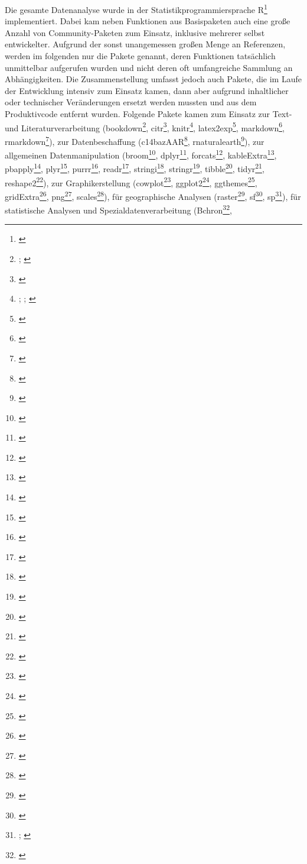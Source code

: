 \documentclass[openany,twoside,twocolumn]{book}
\let\rmarkdownfootnote\footnote%
\def\footnote{\protect\rmarkdownfootnote}
\begin{document}
Die gesamte Datenanalyse wurde in der Statistikprogrammiersprache
R\footnote{\textcite{RCoreTeamLanguageEnvironmentStatistical2016}}
implementiert. Dabei kam neben Funktionen aus Basispaketen auch eine
große Anzahl von Community-Paketen zum Einsatz, inklusive mehrerer
selbst entwickelter. Aufgrund der sonst unangemessen großen Menge an
Referenzen, werden im folgenden nur die Pakete genannt, deren Funktionen
tatsächlich unmittelbar aufgerufen wurden und nicht deren oft
umfangreiche Sammlung an Abhängigkeiten. Die Zusammenstellung umfasst
jedoch auch Pakete, die im Laufe der Entwicklung intensiv zum Einsatz
kamen, dann aber aufgrund inhaltlicher oder technischer Veränderungen
ersetzt werden mussten und aus dem Produktivcode entfernt wurden.
Folgende Pakete kamen zum Einsatz zur Text- und Literaturverarbeitung
(bookdown\footnote{\textcite{xie_bookdown_2016};
  \textcite{xie_bookdown_2018}}, citr\footnote{\textcite{aust_citr_2017}},
knitr\footnote{\textcite{xie_dynamic_2015}; \textcite{xie_knitr_2014};
  \textcite{xie_knitr_2018}}, latex2exp\footnote{\textcite{meschiari_latex2exp_2015}},
markdown\footnote{\textcite{allaire_markdown_2017}}, rmarkdown\footnote{\textcite{allaire_rmarkdown_2018}}),
zur Datenbeschaffung (c14bazAAR\footnote{\textcite{schmid_c14bazaar_2018}},
rnaturalearth\footnote{\textcite{south_rnaturalearth_2017}}), zur
allgemeinen Datenmanipulation (broom\footnote{\textcite{robinson_broom_2018}},
dplyr\footnote{\textcite{wickham_dplyr_2018}}, forcats\footnote{\textcite{wickham_forcats_2018}},
kableExtra\footnote{\textcite{zhu_kableextra_2018}}, pbapply\footnote{\textcite{solymos_pbapply_2018}},
plyr\footnote{\textcite{wickham_split-apply-combine_2011}},
purrr\footnote{\textcite{henry_purrr_2018}}, readr\footnote{\textcite{wickham_readr_2017}},
stringi\footnote{\textcite{gagolewski_r_2018}}, stringr\footnote{\textcite{wickham_stringr_2018}},
tibble\footnote{\textcite{muller_tibble_2018}}, tidyr\footnote{\textcite{wickham_tidyr_2018}},
reshape2\footnote{\textcite{wickham_reshaping_2007}}), zur
Graphikerstellung (cowplot\footnote{\textcite{wilke_cowplot_2018}},
ggplot2\footnote{\textcite{wickham_ggplot2_2016}}, ggthemes\footnote{\textcite{arnold_ggthemes_2018}},
gridExtra\footnote{\textcite{auguie_gridextra_2017}}, png\footnote{\textcite{urbanek_png_2013}},
scales\footnote{\textcite{wickham_scales_2017}}), für geographische
Analysen (raster\footnote{\textcite{hijmans_raster_2017}}, sf\footnote{\textcite{pebesma_sf_2018}},
sp\footnote{\textcite{bivand_applied_2013};
  \textcite{pebesma_classes_2005}}), für statistische Analysen und
Spezialdatenverarbeitung (Bchron\footnote{\textcite{haslett_simple_2008}},
\end{document}
